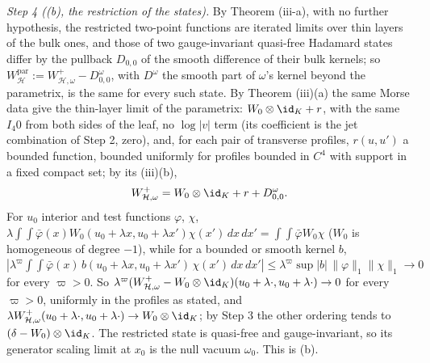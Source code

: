 \emph{Step 4 ((b), the restriction of the states).} By Theorem (iii-a), with no further hypothesis, the restricted two-point functions are iterated limits over thin layers of the bulk ones, and those of two gauge-invariant quasi-free Hadamard states differ by the pullback $D_{0,0}$ of the smooth difference of their bulk kernels; so $W^{\mathrm{par}}_{\mathcal{H}} := W^{+}_{\mathcal{H},\omega} - D^{\omega}_{0,0}$, with $D^{\omega}$ the smooth part of $\omega$'s kernel beyond the parametrix, is the same for every such state. By Theorem (iii)(a) the same Morse data give the thin-layer limit of the parametrix: $W_{0}\otimes\id_{K} + r$, with the same $I_{4}0$ from both sides of the leaf, no $\log|v|$ term (its coefficient is the jet combination of Step 2, zero), and, for each pair of transverse profiles, $r(u, u')$ a bounded function, bounded uniformly for profiles bounded in $C^{4}$ with support in a fixed compact set; by its (iii)(b),
\[
W^{+}_{\mathcal{H},\omega} = W_{0}\otimes\id_{K} + r + D^{\omega}_{0,0}.
\]
For $u_{0}$ interior and test functions $\varphi$, $\chi$, $\lambda\int\!\!\int\bar\varphi(x)W_{0}(u_{0} + \lambda x, u_{0} + \lambda x')\chi(x')\,dx\,dx' = \int\!\!\int\bar\varphi W_{0}\chi$ ($W_{0}$ is homogeneous of degree $-1$), while for a bounded or smooth kernel $b$, $|\lambda^{\varpi}\int\!\!\int\bar\varphi(x)\,b(u_{0} + \lambda x, u_{0} + \lambda x')\,\chi(x')\,dx\,dx'| \le \lambda^{\varpi}\sup|b|\,\|\varphi\|_{1}\|\chi\|_{1} \to 0$ for every $\varpi > 0$. So $\lambda^{\varpi}(W^{+}_{\mathcal{H},\omega} - W_{0}\otimes\id_{K})(u_{0} + \lambda\cdot, u_{0} + \lambda\cdot) \to 0$ for every $\varpi > 0$, uniformly in the profiles as stated, and $\lambda W^{+}_{\mathcal{H},\omega}(u_{0} + \lambda\cdot, u_{0} + \lambda\cdot) \to W_{0}\otimes\id_{K}$; by Step 3 the other ordering tends to $(\delta - W_{0})\otimes\id_{K}$. The restricted state is quasi-free and gauge-invariant, so its generator scaling limit at $x_{0}$ is the null vacuum $\omega_{0}$. This is (b).

